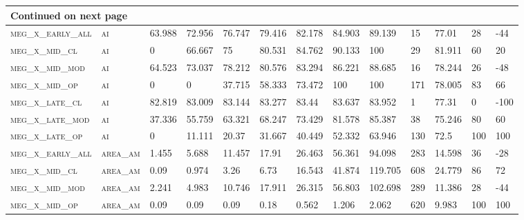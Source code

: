 \begin{landscape}
\begin{center}
\begin{footnotesize}
\begin{longtable}{lllllllllllll}
\hline \multicolumn{13}{|l|}{{Continued on next page}} \\ \hline
\endfoot

\hline \hline
\endlastfoot

\textsc{meg\_x\_early\_all} & \textsc{ai        }   & 63.988   & 72.956   & 76.747   & 79.416   & 82.178   & 84.903   & 89.139    & 15     & 77.01         & 28            & -44           \\
\textsc{meg\_x\_mid\_cl   } & \textsc{ai        }   & 0        & 66.667   & 75       & 80.531   & 84.762   & 90.133   & 100       & 29     & 81.911        & 60            & 20            \\
\textsc{meg\_x\_mid\_mod  } & \textsc{ai        }   & 64.523   & 73.037   & 78.212   & 80.576   & 83.294   & 86.221   & 88.685    & 16     & 78.244        & 26            & -48           \\
\textsc{meg\_x\_mid\_op   } & \textsc{ai        }   & 0        & 0        & 37.715   & 58.333   & 73.472   & 100      & 100       & 171    & 78.005        & 83            & 66            \\
\textsc{meg\_x\_late\_cl  } & \textsc{ai        }   & 82.819   & 83.009   & 83.144   & 83.277   & 83.44    & 83.637   & 83.952    & 1      & 77.31         & 0             & -100          \\
\textsc{meg\_x\_late\_mod } & \textsc{ai        }   & 37.336   & 55.759   & 63.321   & 68.247   & 73.429   & 81.578   & 85.387    & 38     & 75.246        & 80            & 60            \\
\textsc{meg\_x\_late\_op  } & \textsc{ai        }   & 0        & 11.111   & 20.37    & 31.667   & 40.449   & 52.332   & 63.946    & 130    & 72.5          & 100           & 100           \\
\textsc{meg\_x\_early\_all} & \textsc{area\_am  }   & 1.455    & 5.688    & 11.457   & 17.91    & 26.463   & 56.361   & 94.098    & 283    & 14.598        & 36            & -28           \\
\textsc{meg\_x\_mid\_cl   } & \textsc{area\_am  }   & 0.09     & 0.974    & 3.26     & 6.73     & 16.543   & 41.874   & 119.705   & 608    & 24.779        & 86            & 72            \\
\textsc{meg\_x\_mid\_mod  } & \textsc{area\_am  }   & 2.241    & 4.983    & 10.746   & 17.911   & 26.315   & 56.803   & 102.698   & 289    & 11.386        & 28            & -44           \\
\textsc{meg\_x\_mid\_op   } & \textsc{area\_am  }   & 0.09     & 0.09     & 0.09     & 0.18     & 0.562    & 1.206    & 2.062     & 620    & 9.983         & 100           & 100           \\

\end{longtable}
\end{footnotesize}
\end{center}
\end{landscape}
